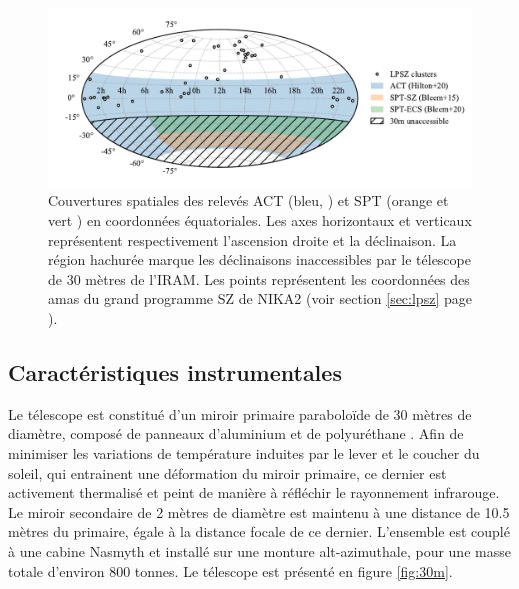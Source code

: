 \begin{figure}[t]
    \centering
    \includegraphics[width=.9\linewidth]{Figures/Chap_nk/footprints.pdf}
    \caption{
        Couvertures spatiales des relevés ACT (bleu, \cite{hilton_atacama_2021}) et SPT (orange et vert \cite{bleem_galaxy_2015,bleem_sptpol_2020}) en coordonnées équatoriales.
        Les axes horizontaux et verticaux représentent respectivement l'ascension droite et la déclinaison.
        La région hachurée marque les déclinaisons inaccessibles par le télescope de 30 mètres de l'IRAM.
        Les points représentent les coordonnées des amas du grand programme SZ de NIKA2 (voir section \ref{sec:lpsz} page \pageref{sec:lpsz}).
    }
    \label{fig:30m_sky}
\end{figure}

\subsection{Caractéristiques instrumentales}\label{sec:30m_opt}

Le télescope est constitué d'un miroir primaire paraboloïde de 30 mètres de diamètre, composé de panneaux d'aluminium et de polyuréthane \cite{baars_iram_1987}.
Afin de minimiser les variations de température induites par le lever et le coucher du soleil, qui entrainent une déformation du miroir primaire, ce dernier est activement thermalisé \cite{baars_thermal_1988} et peint de manière à réfléchir le rayonnement infrarouge.
Le miroir secondaire de 2 mètres de diamètre est maintenu à une distance de 10.5 mètres du primaire, égale à la distance focale de ce dernier.
L'ensemble est couplé à une cabine Nasmyth et installé sur une monture alt-azimuthale, pour une masse totale d'environ 800 tonnes.
Le télescope est présenté en figure \ref{fig:30m}.

